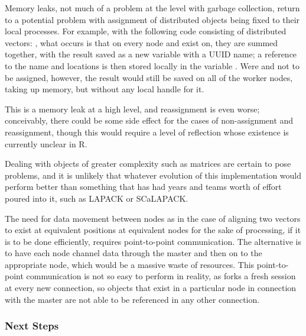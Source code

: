 Memory leaks, not much of a problem at the \R{} level with garbage collection, return to a potential problem with assignment of distributed objects being fixed to their local \R{} processes.
For example, with the following code consisting of distributed vectors: , what occurs is that on every node  and  exist on, they are summed together, with the result saved as a new variable with a UUID name; a reference to the name and locations is then stored locally in the variable .
Were  and  not to be assigned, however, the result would still be saved on all of the worker nodes, taking up memory, but without any local handle for it.

This is a memory leak at a high level, and reassignment is even worse; conceivably, there could be some side effect for the cases of non-assignment and reassignment, though this would require a level of reflection whose existence is currently unclear in R.

Dealing with objects of greater complexity such as matrices are certain to pose problems, and it is unlikely that whatever evolution of this implementation would perform better than something that has had years and teams worth of effort poured into it, such as LAPACK or SCaLAPACK.

The need for data movement between nodes as in the case of aligning two vectors to exist at equivalent positions at equivalent nodes for the sake of processing, if it is to be done efficiently, requires point-to-point communication.
The alternative is to have each node channel data through the master and then on to the appropriate node, which would be a massive waste of resources.
This point-to-point communication is not so easy to perform in reality, as  forks a fresh \R{} session at every new connection, so objects that exist in a particular node in connection with the master are not able to be referenced in any other connection.

\subsubsection{Next Steps}\label{next-steps}


